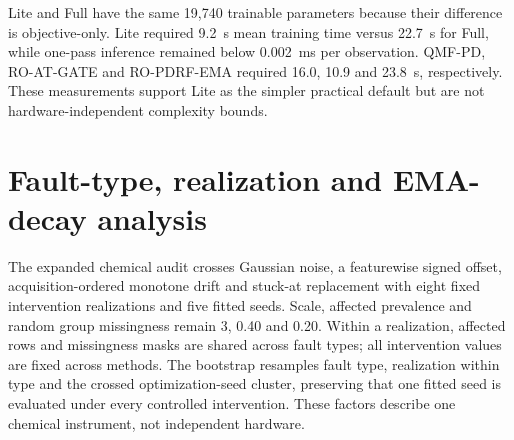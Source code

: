 \documentclass[10pt]{article}
\begin{document}
\begin{table}[ht]
\centering
\caption{Original matched computational-cost audit on a 13th Gen Intel Core i5-13500H using PyTorch in CPU mode. Means and standard deviations are across three fixed seeds. Training time includes checkpoint selection; inference excludes data loading.}
\label{tab:supp-cost}
\resizebox{\textwidth}{!}{}
\end{table}

\begin{table}[H]
\centering
\caption{Expanded measured cost audit for the principal QMF, attention, Lite, Full, EMA and teacher-safeguard runs. Times are descriptive wall-clock measurements from the same CPU software environment; early stopping creates different epoch ranges. Inference excludes data loading.}
\label{tab:supp-expanded-cost}
\resizebox{\textwidth}{!}{}
\end{table}

Lite and Full have the same 19,740 trainable parameters because their difference is objective-only. Lite required 9.2~s mean training time versus 22.7~s for Full, while one-pass inference remained below 0.002~ms per observation. QMF-PD, RO-AT-GATE and RO-PDRF-EMA required 16.0, 10.9 and 23.8~s, respectively. These measurements support Lite as the simpler practical default but are not hardware-independent complexity bounds.

\section{Fault-type, realization and EMA-decay analysis}

The expanded chemical audit crosses Gaussian noise, a featurewise signed offset, acquisition-ordered monotone drift and stuck-at replacement with eight fixed intervention realizations and five fitted seeds. Scale, affected prevalence and random group missingness remain 3, 0.40 and 0.20. Within a realization, affected rows and missingness masks are shared across fault types; all intervention values are fixed across methods. The bootstrap resamples fault type, realization within type and the crossed optimization-seed cluster, preserving that one fitted seed is evaluated under every controlled intervention. These factors describe one chemical instrument, not independent hardware.

\begin{table}[H]
\centering
\caption{Affected-subset discrimination and probability quality across four controlled fault mechanisms, eight realizations and five fitted seeds. Intervals for the EMA99 AUROC contrast use 5,000 crossed-factor bootstrap replicates.}
\label{tab:supp-fault-type-ema}
\resizebox{\textwidth}{!}{}
\end{table}
\end{document}
